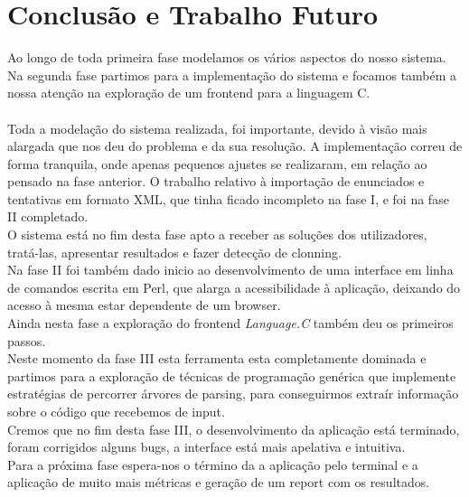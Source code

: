 \chapter{Conclusão e Trabalho Futuro}\label{chap con} 
Ao longo de toda primeira fase modelamos os vários aspectos do nosso sistema. Na segunda fase partimos para a implementação do
sistema e focamos também a nossa atenção na exploração de um frontend para a linguagem C.\\
\\
Toda a modelação do sistema realizada, foi importante, devido à visão mais alargada que nos deu do problema e da sua resolução.
A implementação correu de forma tranquila, onde apenas pequenos ajustes se realizaram, em relação ao pensado na fase anterior.
O trabalho relativo à importação de enunciados e tentativas em formato XML, que tinha ficado incompleto na fase I, e foi na fase II
completado.\\
O sistema está no fim desta fase apto a receber as soluções dos utilizadores, tratá-las, apresentar resultados e fazer detecção de clonning.\\
Na fase II foi também dado inicio ao desenvolvimento de uma interface em linha de comandos escrita em Perl, que alarga a acessibilidade à
aplicação, deixando do acesso à mesma estar dependente de um browser.\\
Ainda nesta fase a exploração do frontend \textit{Language.C} também deu os primeiros passos.\\
Neste momento da fase III esta ferramenta esta completamente dominada e partimos para a exploração de técnicas de programação genérica que
implemente estratégias de percorrer árvores de parsing, para conseguirmos extraír informação sobre o código que recebemos de input.
\\
Cremos que no fim desta fase III, o desenvolvimento da aplicação está terminado, foram corrigidos alguns bugs, a
interface está mais apelativa e intuitiva.\\

Para a próxima fase espera-nos o término da a aplicação pelo terminal e a aplicação de muito mais métricas e geração de um report com os resultados.
